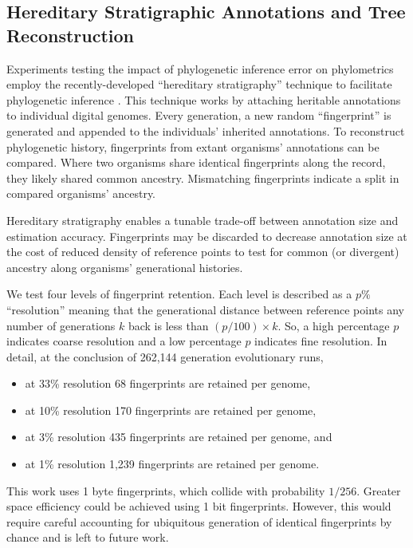\subsection{Hereditary Stratigraphic Annotations and Tree Reconstruction}

Experiments testing the impact of phylogenetic inference error on phylometrics employ the recently-developed ``hereditary stratigraphy'' technique to facilitate phylogenetic inference \citep{moreno2022hstrat}.
This technique works by attaching heritable annotations to individual digital genomes.
Every generation, a new random ``fingerprint'' is generated and appended to the individuals' inherited annotations.
To reconstruct phylogenetic history, fingerprints from extant organisms' annotations can be compared.
Where two organisms share identical fingerprints along the record, they likely shared common ancestry.
Mismatching fingerprints indicate a split in compared organisms' ancestry.

Hereditary stratigraphy enables a tunable trade-off between annotation size and estimation accuracy.
Fingerprints may be discarded to decrease annotation size at the cost of reduced density of reference points to test for common (or divergent) ancestry along organisms' generational histories.

We test four levels of fingerprint retention.
Each level is described as a $p\%$ ``resolution'' meaning that the generational distance between reference points any number of generations $k$ back is less than $(p / 100) \times k$.
So, a high percentage $p$ indicates coarse resolution and a low percentage $p$ indicates fine resolution.
In detail, at the conclusion of 262,144 generation evolutionary runs,
\begin{itemize}
  \item at 33\% resolution 68 fingerprints are retained per genome,
  \item at 10\% resolution 170 fingerprints are retained per genome,
  \item at 3\% resolution 435 fingerprints are retained per genome, and
  \item at 1\% resolution 1,239 fingerprints are retained per genome.
\end{itemize}

This work uses 1 byte fingerprints, which collide with probability $1/256$.
Greater space efficiency could be achieved using 1 bit fingerprints.
However, this would require careful accounting for ubiquitous generation of identical fingerprints by chance and is left to future work.

